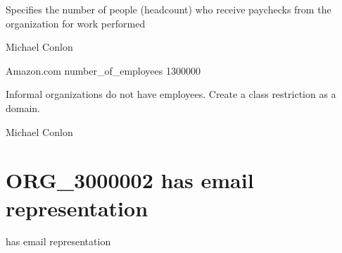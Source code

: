 \documentclass[letterpaper,10pt,english]{sphinxmanual}
\begin{document}
\begin{sphinxShadowBox}

\sphinxAtStartPar
Specifies the number of people (headcount) who receive paychecks from the organization for work performed
\end{sphinxShadowBox}

\begin{sphinxShadowBox}

\sphinxAtStartPar
Michael Conlon 
\end{sphinxShadowBox}

\begin{sphinxShadowBox}

\sphinxAtStartPar
Amazon.com number\_of\_employees 1300000
\end{sphinxShadowBox}

\begin{sphinxShadowBox}

\sphinxAtStartPar
Informal organizations do not have employees.  Create a class restriction as a domain.
\end{sphinxShadowBox}

\begin{sphinxShadowBox}

\sphinxAtStartPar
Michael Conlon 
\end{sphinxShadowBox}
\begin{quote}

\ignorespaces \end{quote}


\section{ORG\_3000002 \sphinxhyphen{} has email representation}
\label{\detokenize{doc-ORG_3000002:org-3000002-has-email-representation}}\label{\detokenize{doc-ORG_3000002:index-0}}\label{\detokenize{doc-ORG_3000002::doc}}
\begin{sphinxShadowBox}

\sphinxAtStartPar
has email representation
\end{sphinxShadowBox}
\end{document}
